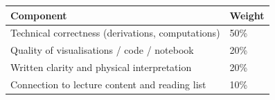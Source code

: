 \documentclass[11pt,a4paper]{article}
\begin{document}
\bigskip
\begin{tcolorbox}[rubricbox, title={SPJU Global Rubric}]
\begin{tabular}{ll}
\toprule
Component & Weight\\
\midrule
Technical correctness (derivations, computations) & 50\%\\
Quality of visualisations / code / notebook       & 20\%\\
Written clarity and physical interpretation       & 20\%\\
Connection to lecture content and reading list    & 10\%\\
\bottomrule
\end{tabular}
\end{tcolorbox}
\end{document}
